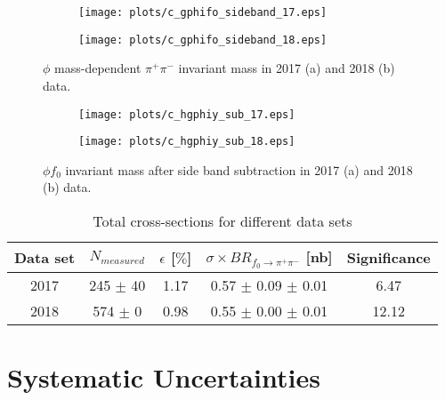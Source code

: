 \begin{figure}[H]
    \centering
    \begin{subfigure}[b]{0.45\textwidth}
        \texttt{[image: plots/c\_gphifo\_sideband\_17.eps]}
        \caption{}
        \label{fig.4.5.4.1.a}
    \end{subfigure}
    \begin{subfigure}[b]{0.45\textwidth}
        \texttt{[image: plots/c\_gphifo\_sideband\_18.eps]}
        \caption{}
        \label{fig.4.5.4.1.b}
    \end{subfigure}
    \caption{$\phi$ mass-dependent $\pi^+ \pi^-$ invariant mass in 2017 (a) and 2018 (b) data.}
    \label{fig.4.5.4.1}
\end{figure}

\begin{figure}[H]
    \centering
    \begin{subfigure}[b]{0.45\textwidth}
        \texttt{[image: plots/c\_hgphiy\_sub\_17.eps]}
        \caption{}
        \label{fig.4.5.4.2.a}
    \end{subfigure}
    \begin{subfigure}[b]{0.45\textwidth}
        \texttt{[image: plots/c\_hgphiy\_sub\_18.eps]}
        \caption{}
        \label{fig.4.5.4.2.b}
    \end{subfigure}
    \caption{$\phi f_0$ invariant mass after side band subtraction in 2017 (a) and 2018 (b) data.}
    \label{fig:4.5.4.2}
\end{figure}

\begin{table}[!htbp]
    \centering
    \caption{Total cross-sections for different data sets}
    \label{tab.4.5.4}
    \begin{tabular}{|c|c|c|c|c|}
        \hline
        Data set & $N_{measured}$ & $\epsilon$ [$\%$] & $\sigma \times BR_{f_{0}\rightarrow\pi^{+}\pi^{-}}$ [nb] & Significance\\
        \hline
        2017 & 245 $\pm$ 40 & 1.17 & 0.57 $\pm$ 0.09 $\pm$ 0.01 & 6.47 \\
        \hline
        2018 & 574 $\pm$ 0 & 0.98 & 0.55 $\pm$ 0.00 $\pm$ 0.01 & 12.12 \\
        \hline
    \end{tabular}
\end{table}

\section{Systematic Uncertainties}
\label{p.4.6}

